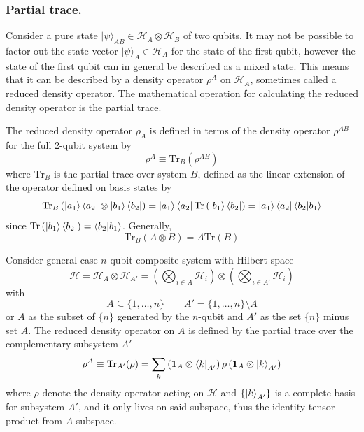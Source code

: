 \documentclass[../../../main.tex]{subfiles}
\begin{document}
\subsubsection{Partial trace.}
Consider a pure state $|\psi\rangle_{AB} \in \mathcal{H}_A \otimes \mathcal{H}_B$ of two qubits.
It may not be possible to factor out the state vector $|\psi\rangle_A \in \mathcal{H}_A$ for the state of the first qubit, however the state of the first qubit can in general be described as a mixed state.
This means that it can be described by a density operator $\rho^A$ on $\mathcal{H}_A$, sometimes called a reduced density operator.
The mathematical operation for calculating the reduced density operator is the partial trace.

The reduced density operator $\rho_A$ is defined in terms of the density operator $\rho^{AB}$ for the full 2-qubit system by
\begin{equation*}
    \rho^A \equiv \mathrm{Tr}_B \left( \rho^{AB} \right)
\end{equation*}
where $\mathrm{Tr}_B$ is the partial trace over system $B$, defined as the linear extension of the operator deﬁned on basis states by
\begin{equation*}
    \mathrm{Tr}_B \left(\ket{a_1}\bra{a_2}\otimes \ket{b_1} \bra{b_2}  \right) = \ket{a_1}\bra{a_2} \mathrm{Tr}\left( \ket{b_1}\bra{b_2} \right) = \ket{a_1}\bra{a_2} \braket{b_2|b_1}
\end{equation*}
since $\mathrm{Tr}\left( \ket{b_1} \bra{b_2} \right) =\braket{b_2|b_1} $.
Generally,
\begin{equation*}
    \mathrm{Tr}_B \left(A \otimes B  \right) = A \mathrm{Tr }(B)
\end{equation*}

Consider general case $n$-qubit composite system with Hilbert space
\begin{equation*}
    \mathcal{H}  = \mathcal{H }_A \otimes \mathcal{H}_{A'} = \left( \bigotimes_{i \in A} \mathcal{H}_{i} \right) \otimes \left( \bigotimes_{i \in A'} \mathcal{H}_{i} \right) 
\end{equation*}
with 
\begin{equation*}
    A \subseteq \{1,\dots,n\}\qquad
    A' = \{1,\dots,n\}\setminus A
\end{equation*}
or $A$ as the subset of $\{n\}$ generated by the $n$-qubit and $A'$ as the set $\{n\}$ minus set $A$.
The reduced density operator on $A$ is defined by the partial trace over the complementary subsystem $A'$
\begin{equation*}
    \rho^{A} 
    \equiv \mathrm{Tr}_{{A}'}(\rho) 
    = \sum_{k} \left( \mathbf{1 }_A\otimes\bra{k}_{A'} \right) \rho \left( \mathbf{1 }_A\otimes\ket{k}_{A'} \right)
\end{equation*}
where $\rho$ denote the density operator acting on $\mathcal{H}$ and $\left\{ \ket{k}_{A'}\right\} $ is a complete basis for subsystem $A'$, and it only lives on said subspace, thus the identity tensor product from $A$ subspace.
\end{document}
